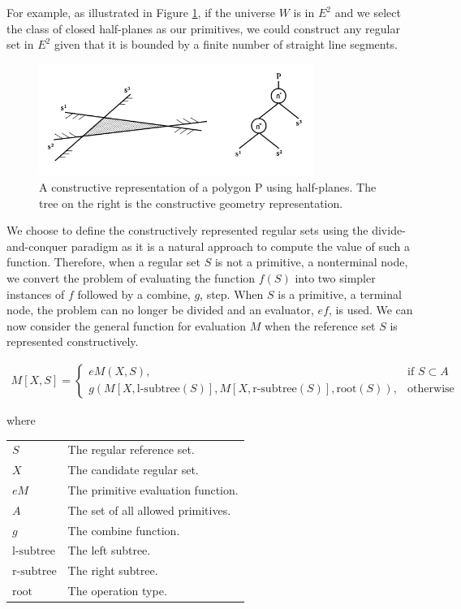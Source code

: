 \documentclass[a4paper,11pt,oneside]{article}
\makeatletter
\newenvironment{conditions}
  {\par\vspace{\abovedisplayskip}\noindent\begin{tabular}{>{$}l<{$} @{${}={}$} l}}
  {\end{tabular}\par\vspace{\belowdisplayskip}}
\makeatother
\begin{document}
For example, as illustrated in Figure \ref{sect3:halfplane-csg}, if the universe $W$ is in $E^2$ and we select the class of closed half-planes as our primitives, we could construct any regular set in $E^2$ given that it is bounded by a finite number of straight line segments.

\begin{figure}[ht]
	\begin{center}
		\includegraphics[width=0.8\textwidth]{section3/3.2/halfplane-csg.png}
	\end{center}
	\caption{A constructive representation of a polygon P using half-planes. The tree on the right is the constructive geometry representation.}
	\label{sect3:halfplane-csg}
\end{figure}

We choose to define the constructively represented regular sets using the divide-and-conquer paradigm as it is a natural approach to compute the value of such a function. Therefore, when a regular set $S$ is not a primitive, a nonterminal node, we convert the problem of evaluating the function $f(S)$ into two simpler instances of $f$ followed by a combine, $g$, step. When $S$ is a primitive, a terminal node, the problem can no longer be divided and an evaluator, $ef$, is used. We can now consider the general function for evaluation $M$ when the reference set $S$ is represented constructively.

\begin{align}
	M[X,S]= 
	\begin{cases}
	eM(X, S),                                                        & \text{if } S \subset A \\
	g(M[X, \text{l-subtree}(S)], M[X, \text{r-subtree}(S)], \text{root}(S)), & \text{otherwise}       
	\end{cases}
\end{align}

where

\begin{conditions}
	S     				  &  The regular reference set. \\
	X     				  &  The candidate regular set. \\
	eM     	  &  The primitive evaluation function. \\
	A     			  	  &  The set of all allowed primitives. \\
	g     				  &  The combine function. \\
	\text{l-subtree}     &  The left subtree. \\
	\text{r-subtree}     &  The right subtree. \\
	\text{root}     	  &  The operation type. \footnotemark \\
\end{conditions}
\end{document}
